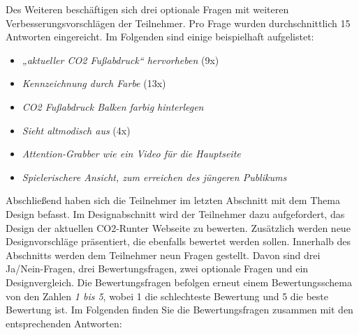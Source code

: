 Des Weiteren beschäftigen sich drei optionale Fragen mit weiteren Verbesserungsvorschlägen der Teilnehmer.
Pro Frage wurden durchschnittlich 15 Antworten eingereicht.
Im Folgenden sind einige beispielhaft aufgelistet:

\begin{itemize}
    \item \textit{„aktueller CO2 Fußabdruck“ hervorheben } (9x)
    \item \textit{Kennzeichnung durch Farbe} (13x)
    \item \textit{CO2 Fußabdruck Balken farbig hinterlegen}
    \item \textit{Sieht altmodisch aus} (4x)
    \item \textit{Attention-Grabber wie ein Video für die Hauptseite}
    \item \textit{Spielerischere Ansicht, zum erreichen des jüngeren Publikums}
\end{itemize}

Abschließend haben sich die Teilnehmer im letzten Abschnitt mit dem Thema Design befasst.
Im Designabschnitt wird der Teilnehmer dazu aufgefordert, das Design der aktuellen CO2-Runter Webseite zu bewerten.
Zusätzlich werden neue Designvorschläge präsentiert, die ebenfalls bewertet werden sollen.
Innerhalb des Abschnitts werden dem Teilnehmer neun Fragen gestellt.
Davon sind drei Ja/Nein-Fragen, drei Bewertungsfragen, zwei optionale Fragen und ein Designvergleich.
Die Bewertungsfragen befolgen erneut einem Bewertungsschema von den Zahlen \textit{1 bis 5}, wobei 1 die schlechteste Bewertung und 5 die beste Bewertung ist.
Im Folgenden finden Sie die Bewertungsfragen zusammen mit den entsprechenden Antworten:

